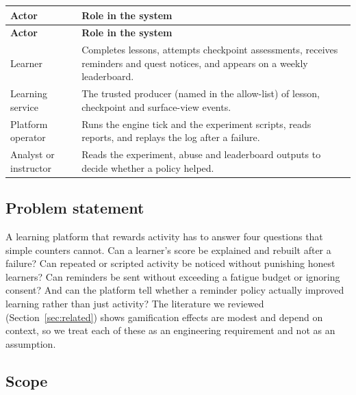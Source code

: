 \documentclass[11pt,a4paper]{article}
\newcommand{\hdr}[1]{\textbf{\color{white}\sffamily\small #1}}
\renewcommand{\_}{\textunderscore\allowbreak{}}
\begin{document}
\begin{xltabular}{\textwidth}{@{}L{3.3cm} Y@{}}
 \hdr{Actor} & \hdr{Role in the system} \\
\endfirsthead
{} \hdr{Actor} & \hdr{Role in the system} \\
\endhead
{} Learner & Completes lessons, attempts checkpoint assessments, receives reminders and quest notices, and appears on a weekly leaderboard. \\
Learning service & The trusted producer (named  in the allow-list) of lesson, checkpoint and surface-view events. \\
 Platform operator & Runs the engine tick and the experiment scripts, reads reports, and replays the log after a failure. \\
Analyst or instructor & Reads the experiment, abuse and leaderboard outputs to decide whether a policy helped. \\
\end{xltabular}

\subsection{Problem statement}

A learning platform that rewards activity has to answer four questions that simple counters cannot. Can a learner's score be explained and rebuilt after a failure? Can repeated or scripted activity be noticed without punishing honest learners? Can reminders be sent without exceeding a fatigue budget or ignoring consent? And can the platform tell whether a reminder policy actually improved learning rather than just activity? The literature we reviewed (Section~\ref{sec:related}) shows gamification effects are modest and depend on context, so we treat each of these as an engineering requirement and not as an assumption.

\subsection{Scope}
\end{document}
